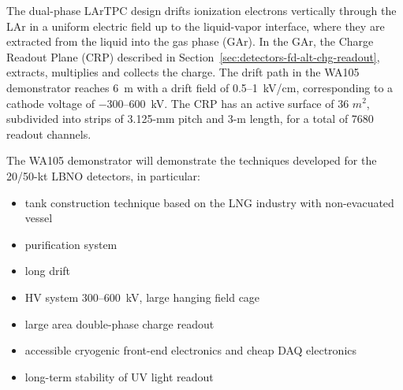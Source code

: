 {The dual-phase LArTPC design drifts ionization electrons
vertically through the LAr in a uniform electric field up to the
liquid-vapor interface, where they are extracted from the liquid into
the gas phase (GAr).
In the GAr, the Charge Readout Plane (CRP) described in
Section~\ref{sec:detectors-fd-alt-chg-readout}, 
extracts, multiplies and collects the charge. 
%
The drift path in the WA105 demonstrator reaches 6~m with a drift
field of 0.5--1~kV/cm, corresponding to a cathode voltage of
$-$300--600~kV. The CRP has an active surface of 36 $m^2$, subdivided
into strips of 3.125-mm pitch and 3-m length, for a total of
\num{7680} readout channels.


The WA105 demonstrator will demonstrate the techniques developed for
the 20/50-kt LBNO detectors, in particular:
\begin{itemize}
\item{tank construction technique based on the LNG industry with non-evacuated vessel}
\item{purification system}
\item{long drift}
\item{HV system 300--600~kV, large hanging field cage}
\item{large area double-phase charge readout}
\item{accessible cryogenic front-end electronics and cheap DAQ electronics}
\item{long-term stability of UV light readout}
\end{itemize}

}
